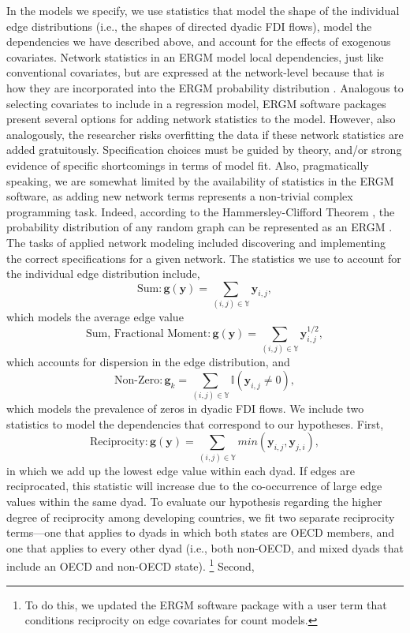 \documentclass[reqno,onecolumn,letterpaper,12pt]{article}
\begin{document}
In the models we specify, we use statistics that model the shape of the individual edge distributions (i.e., the shapes of directed dyadic FDI flows), model the dependencies we have described above, and account for the effects of exogenous covariates. Network statistics in an ERGM model local dependencies, just like conventional covariates, but are expressed at the network-level because that is how they are incorporated into the ERGM probability distribution \citep{desmarais2012micro}. Analogous to selecting covariates to include in a regression model, ERGM software packages present several options for adding network statistics to the model. However, also analogously, the researcher risks overfitting the data if these network statistics are added gratuitously. Specification choices must be guided by theory, and/or strong evidence of specific shortcomings in terms of model fit.  Also, pragmatically speaking, we are somewhat limited by the availability of statistics in the ERGM software, as adding new network terms represents a non-trivial complex programming task.  Indeed, according to the Hammersley-Clifford Theorem \citep{hammersley1971markov}, the probability distribution of any random graph can be represented as an ERGM \citep{yang2014estimation}. The tasks of applied network modeling included discovering and implementing the correct specifications for a given network. The statistics we use to account for the individual edge distribution include, $$\text{Sum}:\bm{g(y)} = \sum_{(i,j) {\in} \mathbb{Y}}\bm{y}_{i,j},$$ which models the average edge value $$\text{Sum, Fractional Moment}:\bm{g(y)} = \sum_{(i,j) {\in} \mathbb{Y}}\bm{y}_{i,j}^{1/2},$$ which accounts for dispersion in the edge distribution, and
$$\text{Non-Zero}: \bm{g}_k = \sum_{(i,j) {\in} \mathbb{Y}} \mathbb{I}(\bm{y}_{i,j} \neq 0),$$ which models the prevalence of zeros in dyadic FDI flows. We include two statistics to model the dependencies that correspond to our hypotheses. First,
$$ \text{Reciprocity}: \bm{g(y)} = \sum_{(i,j) {\in} \mathbb{Y}}min(\bm{y}_{i,j},\bm{y}_{j,i}),$$ in which we add up the lowest edge value within each dyad. If edges are reciprocated, this statistic will increase due to the co-occurrence of large edge values within the same dyad. To evaluate our hypothesis regarding the higher degree of reciprocity among developing countries, we fit two separate reciprocity terms---one that applies to dyads in which both states are OECD members, and one that applies to every other dyad (i.e., both non-OECD, and mixed dyads that include an OECD and non-OECD state). \footnote{To do this, we updated the ERGM software package with a user term that conditions reciprocity on edge covariates for count models.} Second,
\end{document}
